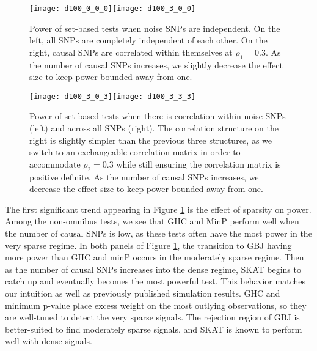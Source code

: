 \documentclass[12pt]{article}
\begin{document}
\begin{figure}
\begin{center}
\centerline{\texttt{[image: d100\_0\_0\_0]}\texttt{[image: d100\_3\_0\_0]}}
\end{center}
\caption{Power of set-based tests when noise SNPs are independent.  On the left, all SNPs are completely independent of each other. On the right, causal SNPs are correlated within themselves at $\rho_{1}=0.3$.  As the number of causal SNPs increases, we slightly decrease the effect size to keep power bounded away from one.}
\label{p2_fig:pow_fig1}
\end{figure}

\begin{figure}
\begin{center}
\centerline{\texttt{[image: d100\_3\_0\_3]}\texttt{[image: d100\_3\_3\_3]}}
\end{center}
\caption{Power of set-based tests when there is correlation within noise SNPs (left) and across all SNPs (right).  
The correlation structure on the right is slightly simpler than the previous three structures, as we switch to an exchangeable correlation matrix in order to accommodate $\rho_{2}=0.3$ while still ensuring the correlation matrix is positive definite.  As the number of causal SNPs increases, we decrease the effect size to keep power bounded away from one.}
\label{p2_fig:pow_fig2}
\end{figure}


The first significant trend appearing in Figure \ref{p2_fig:pow_fig1} is 
the effect of sparsity on power.  
Among the non-omnibus tests, we see that GHC and MinP perform well when the number of causal SNPs is low,
as these tests often have the most power in the very sparse regime.
In both panels of Figure \ref{p2_fig:pow_fig1}, the transition to GBJ having
more power than GHC and minP occurs in the moderately sparse regime. 
Then as the number of causal SNPs increases into the dense regime, 
SKAT begins to catch up and eventually becomes the most powerful test. 
This behavior matches our intuition as well as previously published simulation
results.
GHC and minimum p-value place excess weight on the most outlying observations, 
so they are well-tuned to detect the very sparse signals. 
The rejection region of GBJ is better-suited to find moderately sparse signals, and SKAT is known to perform well
with dense signals. 
\end{document}
